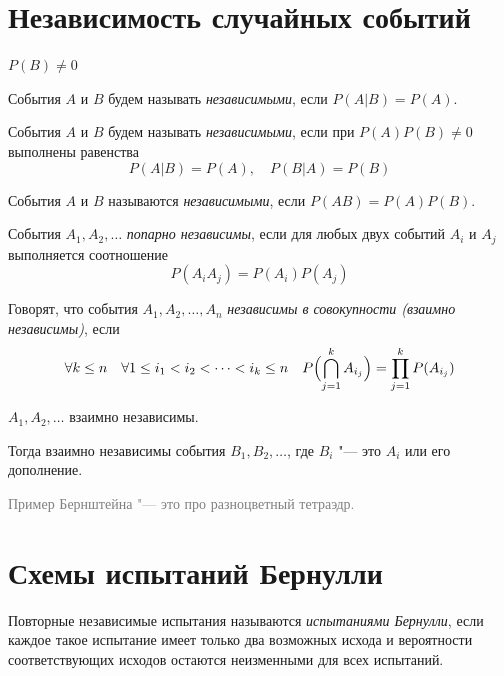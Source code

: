 \section{Независимость случайных событий}

\begin{definition}
	$ P(B) \ne 0 $

	События $ A $ и $ B $ будем называть \emph{независимыми}, если $ P(A|B) = P(A) $.
\end{definition}

\begin{definition}
	События $ A $ и $ B $ будем называть \emph{независимыми}, если при $ P(A)P(B) \ne 0 $ выполнены
	равенства
	$$ P(A|B) = P(A), \quad P(B|A) = P(B) $$
\end{definition}

\begin{definition}
	События $ A $ и $ B $ называются \emph{независимыми}, если $ P(AB) = P(A)P(B) $.
\end{definition}

\begin{definition}
	События $ A_1, A_2, \dotsc $ \emph{попарно независимы}, если для любых двух событий $ A_i $ и
	$ A_j $ выполняется соотношение
	$$ P(A_iA_j) = P(A_i)P(A_j) $$
\end{definition}

\begin{definition}
	Говорят, что события $ A_1, A_2, \dots, A_n $ \emph{независимы в совокупности (взаимно
	независимы)}, если
	$$ \forall k \le n \quad \forall 1 \le i_1 < i_2 < \dots < i_k \le n \quad
	P \Bigl( \bigcap_{j = 1}^k A_{i_j} \Bigr) = \prod_{j = 1}^k P(A_{i_j}) $$
\end{definition}

\begin{theorem}
	$ A_1, A_2, \dotsc $ взаимно независимы.

	Тогда взаимно независимы события $ B_1, B_2, \dotsc $, где $ B_i $ "--- это $ A_i $ или его
	дополнение.
\end{theorem}

\textcolor{gray}{Пример Бернштейна "--- это про разноцветный тетраэдр.}

\section{Схемы испытаний Бернулли}

\begin{definition}
	Повторные независимые испытания называются \emph{испытаниями Бернулли}, если каждое такое
	испытание имеет только два возможных исхода и вероятности соответствующих исходов остаются
	неизменными для всех испытаний.
\end{definition}

